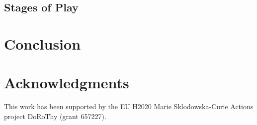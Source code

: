 \documentclass[sigconf]{acmart}
\begin{document}
\subsection{Stages of Play}


\section{Conclusion}
\label{sec:conclusion}

\section*{Acknowledgments}

This work has been supported by the EU H2020 Marie Sklodowska-Curie Actions
project DoRoThy (grant 657227).



\end{document}
